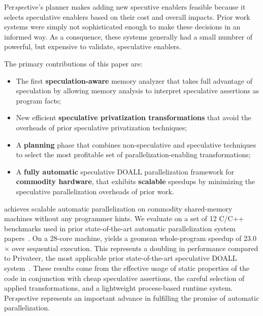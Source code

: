 Per{\em spec}tive's planner makes adding new specutive enablers
feasible because it selects speculative enablers based on their cost
and overall impacts.  Prior work systems were simply not sophisticated
enough to make these decisions in an informed way.  As a consquence,
these systems generally had a small numbrer of powerful, but expensive
to validate, speculative enablers.

The primary contributions of this paper are:
\begin{itemize}

\item The first \textbf{speculation-aware} memory analyzer that takes
  full advantage of speculation by allowing memory analysis to
  interpret speculative assertions as program facts;

\item New efficient \textbf{speculative privatization transformations}
that avoid the overheads of prior speculative privatization
techniques;

\item A \textbf{planning} phase that combines non-speculative
and speculative techniques to select the most profitable set of
parallelization-enabling transformations;

\item A \textbf{fully automatic} speculative DOALL parallelization
framework for \textbf{commodity hardware}, that exhibits
\textbf{scalable} speedups by minimizing the speculative
parallelization overheads of prior work.

\end{itemize}

\name achieves scalable automatic parallelization on commodity
shared-memory machines without any programmer hints.  We evaluate
\name on a set of 12 C/C++ benchmarks used in prior state-of-the-art
automatic parallelization system
papers~\cite{johnson:12:pldi,kim:12:cgo,simone:12:cgo}. On a 28-core
machine, \name yields a geomean whole-program speedup of 23.0$\times$
over sequential execution.  This represents a doubling in performance
compared to Privateer, the most applicable prior state-of-the-art
speculative DOALL system~\cite{johnson:12:pldi}.  These results come
from the effective usage of static properties of the code in
conjunction with cheap speculative assertions, the careful selection
of applied transformations, and a lightweight process-based runtime
system.  Per{\em spec}tive represents an important advance in
fulfilling the promise of automatic parallelization.



